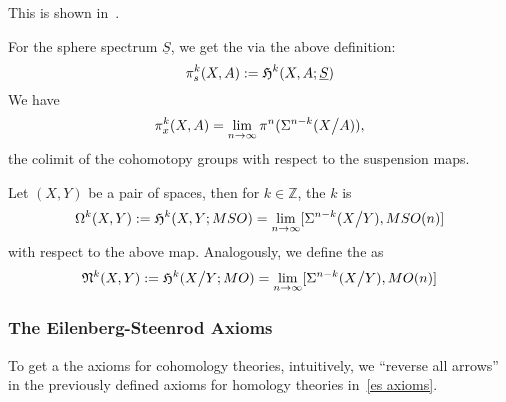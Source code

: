 \documentclass[a4paper,11pt]{article}
\begin{document}
This is shown in\ \cite{whitehead}.

\begin{example}\label{stable cohomotopy groups}
    For the sphere spectrum \(\underline{S}\), we get the  via the above definition:
    \[\pi_s^k(X,A):=\mathfrak{H}^k(X,A;\underline{S})\]
    We have
    \[\pi_x^k(X,A)=\lim_{n\to\infty}\pi^n(\Sigma^{n-k}(X\big/A)),\]
    the colimit of the cohomotopy groups with respect to the suspension maps.
\end{example}

\begin{definition}
    Let \((X,Y)\) be a pair of spaces, then for \(k\in\mathbb{Z}\), the \(k\) is
    \[\Omega^k(X,Y):=\mathfrak{H}^k(X,Y;MSO)=\lim_{n\to\infty}[\Sigma^{n-k}(X\big/Y),MSO(n)]\]
    with respect to the above map.
    Analogously, we define the  as
    \[\mathfrak{N}^k(X,Y):= \mathfrak{H}^k(X\big/Y;MO)=\lim_{n\to\infty}[\Sigma^{n-k}(X\big/ Y),MO(n)]\]
\end{definition}



\subsubsection{The Eilenberg-Steenrod Axioms}
To get a the axioms for cohomology theories, intuitively, we \enquote{reverse all arrows} in the previously defined axioms for homology theories in\ \ref{es axioms}.
\end{document}
